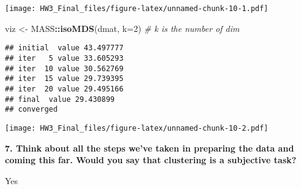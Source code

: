 \documentclass[]{article}
\newenvironment{Shaded}{\begin{snugshade}}{\end{snugshade}}
\newcommand{\CommentTok}[1]{\textcolor[rgb]{0.56,0.35,0.01}{\textit{#1}}}
\newcommand{\DataTypeTok}[1]{\textcolor[rgb]{0.13,0.29,0.53}{#1}}
\newcommand{\DecValTok}[1]{\textcolor[rgb]{0.00,0.00,0.81}{#1}}
\newcommand{\KeywordTok}[1]{\textcolor[rgb]{0.13,0.29,0.53}{\textbf{#1}}}
\newcommand{\NormalTok}[1]{#1}
\newcommand{\OperatorTok}[1]{\textcolor[rgb]{0.81,0.36,0.00}{\textbf{#1}}}
\newcommand{\StringTok}[1]{\textcolor[rgb]{0.31,0.60,0.02}{#1}}
\begin{document}
\texttt{[image: HW3\_Final\_files/figure-latex/unnamed-chunk-10-1.pdf]}

\begin{Shaded}
\begin{Highlighting}[]
\NormalTok{viz <-}\StringTok{ }\NormalTok{MASS}\OperatorTok{::}\KeywordTok{isoMDS}\NormalTok{(dmat, }\DataTypeTok{k=}\DecValTok{2}\NormalTok{) }\CommentTok{# k is the number of dim}
\end{Highlighting}
\end{Shaded}

\begin{verbatim}
## initial  value 43.497777 
## iter   5 value 33.605293
## iter  10 value 30.562769
## iter  15 value 29.739395
## iter  20 value 29.495166
## final  value 29.430899 
## converged
\end{verbatim}

\begin{Shaded}
\end{Shaded}

\texttt{[image: HW3\_Final\_files/figure-latex/unnamed-chunk-10-2.pdf]}

\textbf{7. Think about all the steps we've taken in preparing the data
and coming this far. Would you say that clustering is a subjective
task?}

Yes
\end{document}
